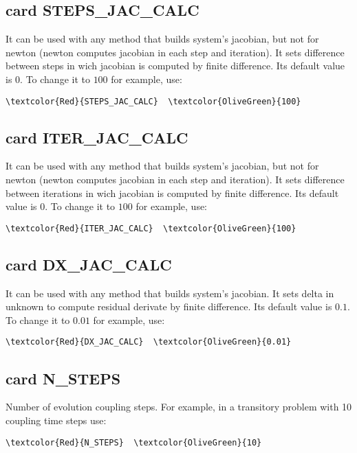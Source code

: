 \subsection{card STEPS_JAC_CALC}
It can be used with any method that builds system's jacobian, but not for newton (newton computes jacobian in each step and iteration). It sets difference between steps in wich jacobian is computed by finite difference. Its default value is $0$. To change it to $100$ for example, use:
\begin{Verbatim}[frame=single,commandchars=\\\{\}]
\textcolor{Red}{STEPS_JAC_CALC}  \textcolor{OliveGreen}{100}
\end{Verbatim}

\subsection{card ITER_JAC_CALC}
It can be used with any method that builds system's jacobian, but not for newton (newton computes jacobian in each step and iteration). It sets difference between iterations in wich jacobian is computed by finite difference. Its default value is $0$. To change it to $100$ for example, use:
\begin{Verbatim}[frame=single,commandchars=\\\{\}]
\textcolor{Red}{ITER_JAC_CALC}  \textcolor{OliveGreen}{100}
\end{Verbatim}

\subsection{card DX_JAC_CALC}
It can be used with any method that builds system's jacobian. It sets delta in unknown to compute residual derivate by finite difference. Its default value is $0.1$. To change it to $0.01$ for example, use:
\begin{Verbatim}[frame=single,commandchars=\\\{\}]
\textcolor{Red}{DX_JAC_CALC}  \textcolor{OliveGreen}{0.01}
\end{Verbatim}

\subsection{card N_STEPS}
Number of evolution coupling steps. For example, in a transitory problem with 10 coupling time steps use:
\begin{Verbatim}[frame=single,commandchars=\\\{\}]
\textcolor{Red}{N_STEPS}  \textcolor{OliveGreen}{10}
\end{Verbatim}

